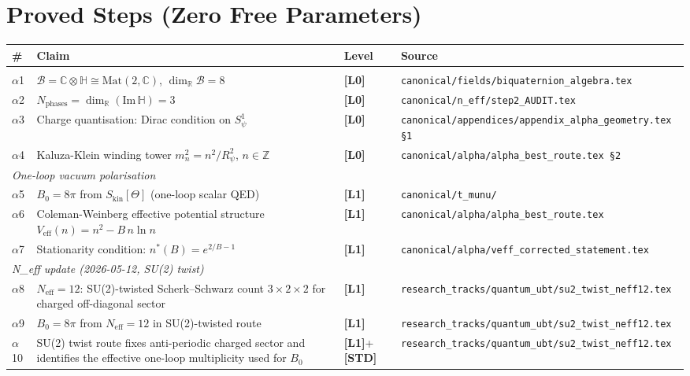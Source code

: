 \documentclass[12pt,a4paper]{article}
\theoremstyle{definition}
\theoremstyle{remark}
\newcommand{\Lzero}{\textbf{[L0]}}
\newcommand{\Lone}{\textbf{[L1]}}
\newcommand{\STD}{\textbf{[STD]}}
\begin{document}
\section{Proved Steps (Zero Free Parameters)}
\label{sec:proved}

\begin{longtable}{p{0.8cm} p{6.8cm} p{1.6cm} p{4.5cm}}
\toprule
\textbf{\#} & \textbf{Claim} & \textbf{Level} & \textbf{Source} \\
\midrule
\endhead
\bottomrule
\endfoot

\multicolumn{4}{l}{\textit{Algebra and compactification}} \\[2pt]
$\alpha$1 & $\mathcal{B} = \mathbb{C}\otimes\mathbb{H} \cong \mathrm{Mat}(2,\mathbb{C})$,
  $\dim_{\mathbb{R}}\mathcal{B}=8$ & \Lzero &
  \texttt{canonical/fields/biquaternion\_algebra.tex} \\[4pt]
$\alpha$2 & $N_{\mathrm{phases}} = \dim_{\mathbb{R}}(\mathrm{Im}\,\mathbb{H}) = 3$ & \Lzero &
  \texttt{canonical/n\_eff/step2\_AUDIT.tex} \\[4pt]
$\alpha$3 & Charge quantisation: Dirac condition on $S^1_\psi$ & \Lzero &
  \texttt{canonical/appendices/appendix\_alpha\_geometry.tex \S1} \\[4pt]
$\alpha$4 & Kaluza-Klein winding tower $m_n^2 = n^2/R_\psi^2$, $n\in\mathbb{Z}$ & \Lzero &
  \texttt{canonical/alpha/alpha\_best\_route.tex \S2} \\[8pt]

\multicolumn{4}{l}{\textit{One-loop vacuum polarisation}} \\[2pt]
$\alpha$5 & $B_0 = 8\pi$ from $S_{\mathrm{kin}}[\Theta]$ (one-loop scalar QED) & \Lone &
  \texttt{canonical/t\_munu/} \\[4pt]
$\alpha$6 & Coleman-Weinberg effective potential structure
  $V_{\mathrm{eff}}(n) = n^2 - B\,n\ln n$ & \Lone &
  \texttt{canonical/alpha/alpha\_best\_route.tex} \\[4pt]
$\alpha$7 & Stationarity condition: $n^*(B) = e^{2/B-1}$ & \Lone &
  \texttt{canonical/alpha/veff\_corrected\_statement.tex} \\[8pt]

\multicolumn{4}{l}{\textit{N\_eff update (2026-05-12, SU(2) twist)}} \\[2pt]
$\alpha$8 & $N_{\mathrm{eff}} = 12$: SU(2)-twisted Scherk--Schwarz count
  $3\times2\times2$ for charged off-diagonal sector & \Lone &
  \texttt{research\_tracks/quantum\_ubt/su2\_twist\_neff12.tex} \\[4pt]
$\alpha$9 & $B_0 = 8\pi$ from $N_{\mathrm{eff}}=12$ in SU(2)-twisted route & \Lone &
  \texttt{research\_tracks/quantum\_ubt/su2\_twist\_neff12.tex} \\[4pt]
$\alpha$10 & SU(2) twist route fixes anti-periodic charged sector and
  identifies the effective one-loop multiplicity used for $B_0$ & \Lone + \STD &
  \texttt{research\_tracks/quantum\_ubt/su2\_twist\_neff12.tex} \\[8pt]


\end{longtable}
\end{document}
